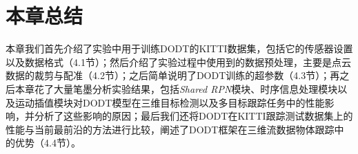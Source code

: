 \section{本章总结}
\label{exp_conclusion}
本章我们首先介绍了实验中用于训练DODT的KITTI数据集，包括它的传感器设置以及数据格式（4.1节）；然后介绍了实验过程中使用到的数据预处理，主要是点云数据的裁剪与配准（4.2节）；之后简单说明了DODT训练的超参数（4.3节）；再之后本章花了大量笔墨分析实验结果，包括\textit{Shared RPN}模块、时序信息处理模块以及运动插值模块对DODT模型在三维目标检测以及多目标跟踪任务中的性能影响，并分析了这些影响的原因；最后我们还将DODT在KITTI跟踪测试数据集上的性能与当前最前沿的方法进行比较，阐述了DODT框架在三维流数据物体跟踪中的优势（4.4节）。

\ifprint
	\newpage
	\thispagestyle{empty}
	\mbox{}
	
	\clearpage
	\setcounter{page}{10}
\fi